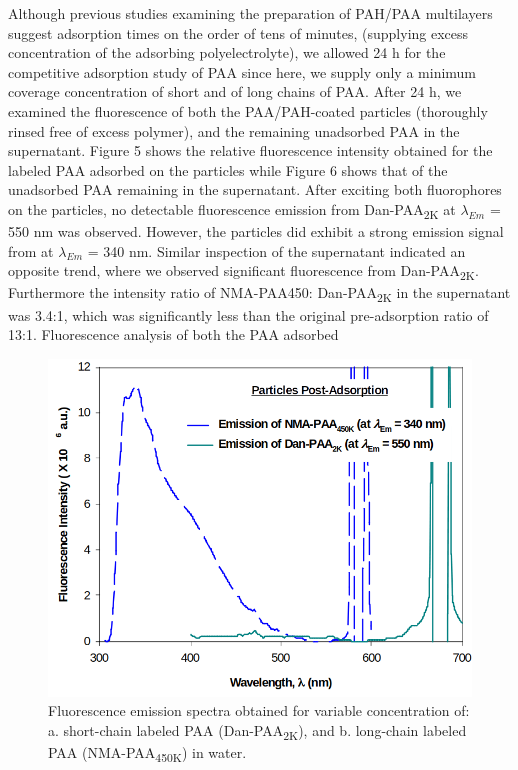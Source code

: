 \documentclass[journal=mamobx,manuscript=article]{achemso}
\begin{document}
Although previous studies examining the preparation of PAH/PAA multilayers suggest adsorption times on the order of tens of minutes, (supplying excess concentration of the adsorbing polyelectrolyte), we allowed 24 h for the competitive adsorption study of PAA since here, we supply only a minimum coverage concentration of short and of long chains of PAA.  After 24 h, we examined the fluorescence of both the PAA/PAH-coated particles (thoroughly rinsed free of excess polymer), and the remaining unadsorbed PAA in the supernatant.  Figure 5 shows the relative fluorescence intensity obtained for the labeled PAA adsorbed on the particles while Figure 6 shows that of the unadsorbed PAA remaining in the supernatant.  After exciting both fluorophores on the particles, no detectable fluorescence emission from Dan-PAA\textsubscript{2K} at $\lambda_{Em}$ = 550 nm was observed.  However, the particles did exhibit a strong emission signal from at $\lambda_{Em}$ = 340 nm.  Similar inspection of the supernatant indicated an opposite trend, where we observed significant fluorescence from Dan-PAA\textsubscript{2K}.  Furthermore the intensity ratio of NMA-PAA450: Dan-PAA\textsubscript{2K} in the supernatant was 3.4:1, which was significantly less than the original pre-adsorption ratio of 13:1.  Fluorescence analysis of both the PAA adsorbed 


\begin{figure}[H]
\includegraphics[scale=1.75]{fig5.png}
\caption{Fluorescence emission spectra obtained for variable concentration of: a. short-chain labeled PAA (Dan-PAA\textsubscript{2K}), and b. long-chain labeled PAA (NMA-PAA\textsubscript{450K}) in water.}
\label{figure 5}
\end{figure}
\end{document}
